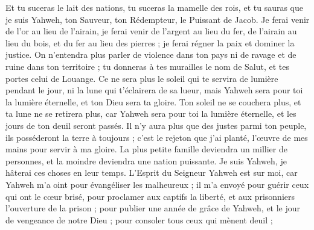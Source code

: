 \begin{multicols}{2}
Et tu suceras le lait des nations, tu suceras la mamelle des rois, et tu sauras que je suis Yahweh, ton Sauveur, ton Rédempteur, le Puissant de Jacob.
Je ferai venir de l'or au lieu de l'airain, je ferai venir de l'argent au lieu du fer, de l'airain au lieu du bois, et du fer au lieu des pierres ; je ferai régner la paix et dominer la justice.
On n'entendra plus parler de violence dans ton pays ni de ravage et de ruine dans ton territoire ; tu donneras à tes murailles le nom de Salut, et tes portes celui de Louange.
Ce ne sera plus le soleil qui te servira de lumière pendant le jour, ni la lune qui t'éclairera de sa lueur, mais Yahweh sera pour toi la lumière éternelle, et ton Dieu sera ta gloire.
Ton soleil ne se couchera plus, et ta lune ne se retirera plus, car Yahweh sera pour toi la lumière éternelle, et les jours de ton deuil seront passés.
Il n'y aura plus que des justes parmi ton peuple, ils posséderont la terre à toujours ; c'est le rejeton que j'ai planté, l'œuvre de mes mains pour servir à ma gloire.
La plus petite famille deviendra un millier de personnes, et la moindre deviendra une nation puissante. Je suis Yahweh, je hâterai ces choses en leur temps.
\VerseOne{}L'Esprit du Seigneur Yahweh est sur moi, car Yahweh m'a oint pour évangéliser les malheureux ; il m'a envoyé pour guérir ceux qui ont le cœur brisé, pour proclamer aux captifs la liberté, et aux prisonniers l'ouverture de la prison ;
pour publier une année de grâce de Yahweh, et le jour de vengeance de notre Dieu ; pour consoler tous ceux qui mènent deuil ;

\end{multicols}
